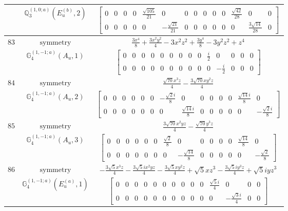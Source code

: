 \documentclass[fleqn,8pt,landscape]{jsarticle}
\begin{document}
\begin{longtable}{ccc}
$  $ & $ \mathbb{Q}_{3}^{(1,0;a)}(E_{u}^{(b)},2) $ & $ \begin{bmatrix} 0 & 0 & 0 & 0 & \frac{\sqrt{105}}{21} & 0 & 0 & 0 & 0 & 0 & 0 & \frac{\sqrt{42}}{28} & 0 & 0 \\ 0 & 0 & 0 & 0 & 0 & - \frac{\sqrt{21}}{21} & 0 & 0 & 0 & 0 & 0 & 0 & \frac{3 \sqrt{14}}{28} & 0 \end{bmatrix} $ \\ \hline
$ 83 $ & $ \text{symmetry} $ & $ \frac{3 x^{4}}{8} + \frac{3 x^{2} y^{2}}{4} - 3 x^{2} z^{2} + \frac{3 y^{4}}{8} - 3 y^{2} z^{2} + z^{4} $ \\
$  $ & $ \mathbb{G}_{4}^{(1,-1;a)}(A_{u},1) $ & $ \begin{bmatrix} 0 & 0 & 0 & 0 & 0 & 0 & 0 & 0 & 0 & \frac{i}{2} & 0 & 0 & 0 & 0 \\ 0 & 0 & 0 & 0 & 0 & 0 & 0 & 0 & 0 & 0 & - \frac{i}{2} & 0 & 0 & 0 \end{bmatrix} $ \\ \hline
$ 84 $ & $ \text{symmetry} $ & $ \frac{\sqrt{70} x^{3} z}{4} - \frac{3 \sqrt{70} x y^{2} z}{4} $ \\
$  $ & $ \mathbb{G}_{4}^{(1,-1;a)}(A_{u},2) $ & $ \begin{bmatrix} 0 & 0 & 0 & 0 & 0 & 0 & - \frac{\sqrt{2} i}{8} & 0 & 0 & 0 & 0 & 0 & \frac{\sqrt{14} i}{8} & 0 \\ 0 & 0 & 0 & 0 & 0 & 0 & 0 & \frac{\sqrt{14} i}{8} & 0 & 0 & 0 & 0 & 0 & - \frac{\sqrt{2} i}{8} \end{bmatrix} $ \\ \hline
$ 85 $ & $ \text{symmetry} $ & $ \frac{3 \sqrt{70} x^{2} y z}{4} - \frac{\sqrt{70} y^{3} z}{4} $ \\
$  $ & $ \mathbb{G}_{4}^{(1,-1;a)}(A_{u},3) $ & $ \begin{bmatrix} 0 & 0 & 0 & 0 & 0 & 0 & \frac{\sqrt{2}}{8} & 0 & 0 & 0 & 0 & 0 & \frac{\sqrt{14}}{8} & 0 \\ 0 & 0 & 0 & 0 & 0 & 0 & 0 & - \frac{\sqrt{14}}{8} & 0 & 0 & 0 & 0 & 0 & - \frac{\sqrt{2}}{8} \end{bmatrix} $ \\ \hline
$ 86 $ & $ \text{symmetry} $ & $ - \frac{3 \sqrt{5} x^{3} z}{4} - \frac{3 \sqrt{5} i x^{2} y z}{4} - \frac{3 \sqrt{5} x y^{2} z}{4} + \sqrt{5} x z^{3} - \frac{3 \sqrt{5} i y^{3} z}{4} + \sqrt{5} i y z^{3} $ \\
$  $ & $ \mathbb{G}_{4}^{(1,-1;a)}(E_{u}^{(a)},1) $ & $ \begin{bmatrix} 0 & 0 & 0 & 0 & 0 & 0 & 0 & 0 & 0 & 0 & \frac{\sqrt{5} i}{4} & 0 & 0 & 0 \\ 0 & 0 & 0 & 0 & 0 & 0 & 0 & 0 & 0 & 0 & 0 & - \frac{\sqrt{3} i}{4} & 0 & 0 \end{bmatrix} $ \\ \hline

\end{longtable}
\end{document}

